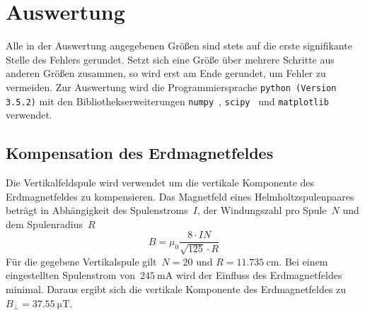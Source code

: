 \section{Auswertung}
\label{sec:auswertung}

Alle in der Auswertung angegebenen Größen sind stets auf die erste signifikante
Stelle des Fehlers gerundet. Setzt sich eine Größe über mehrere Schritte aus
anderen Größen zusammen, so wird erst am Ende gerundet, um Fehler zu vermeiden.
Zur Auswertung wird die Programmiersprache \texttt{python (Version 3.5.2)} mit
den Bibliothekserweiterungen \texttt{numpy}~\cite{numpy},
\texttt{scipy}~\cite{scipy} und \texttt{matplotlib}~\cite{matplotlib} verwendet.

\subsection{Kompensation des Erdmagnetfeldes}
Die Vertikalfeldspule wird verwendet um die vertikale Komponente des
Erdmagnetfeldes zu kompensieren. Das Magnetfeld eines Helmholtzspulenpaares
beträgt in Abhängigkeit des Spulenstroms~$I$, der Windungszahl pro Spule~$N$ und
dem Spulenradius~$R$
%
\begin{equation}
  B = \mu_0\frac{8\cdot IN}{\sqrt{125}\cdot R}
  \label{eq:bfeld}
\end{equation}
%
Für die gegebene Vertikalspule gilt~$N=20$ und $R=\SI{11.735}{\centi\metre}$.
Bei einem eingestellten Spulenstrom von~$\SI{245}{\milli\ampere}$ wird der
Einfluss des Erdmagnetfeldes minimal. Daraus ergibt sich die vertikale
Komponente des Erdmagnetfeldes zu~$B_{\bot}=\SI{37.55}{\micro\tesla}$.


